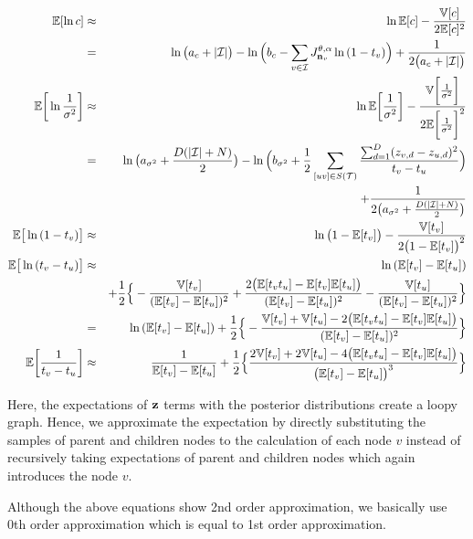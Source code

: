 \documentclass{article}
\begin{document}
	\begin{eqnarray}
		\mathbb{E}[\ln{c}] &\approx & \ln{\mathbb{E}[c]} - \frac{\mathbb{V}[c]}{2\mathbb{E}[c]^2} \nonumber \\
		&=& \ln{ \big( a_c + |\mathcal{I}| \big)} - \ln{ \Big( b_c - \sum_{v \in \mathcal{I}}J^{\theta, \alpha}_{\bold{n}_v}\ln{(1 - t_v})\Big)} + \frac{1}{2 \big( a_c + |\mathcal{I}| \big)} \\
		\mathbb{E} \bigg[ \ln{\frac{1}{\sigma^2}} \bigg] &\approx & \ln{\mathbb{E} \bigg[ \frac{1}{\sigma^2} \bigg]} - \frac{\mathbb{V}\bigg[ \frac{1}{\sigma^2} \bigg]}{2\mathbb{E}\bigg[ \frac{1}{\sigma^2} \bigg]^2} \nonumber \\
		&=& \ln{ \big( a_{\sigma^2} + \frac{D(|\mathcal{I}| + N)}{2} \big) } - \ln{ \Big( b_{\sigma^2} + \frac{1}{2}\sum_{[uv] \in S(\mathcal{T})}\frac{\sum^D_{d=1}(z_{v,d} - z_{u,d})^2}{t_v - t_u}\Big)} \nonumber \\
		& & + \frac{1}{2 \big( a_{\sigma^2} + \frac{D(|\mathcal{I}| + N)}{2} \big)}	 \nonumber \\
		\mathbb{E} \big[ \ln{(1 - t_v)} \big] &\approx & \ln{ \big( 1 - \mathbb{E}[t_v] \big)} - \frac{\mathbb{V}[t_v]}{2 \big( 1 - \mathbb{E}[t_v] \big)^2} \\
		\mathbb{E} \big[ \ln{(t_v - t_u)} \big] &\approx & \ln{(\mathbb{E}[t_v] - \mathbb{E}[t_u])} \nonumber \\
		& & + \frac{1}{2} \Big\{ -\frac{\mathbb{V}[t_v]}{(\mathbb{E}[t_v] - \mathbb{E}[t_u])^2} + \frac{2\big( \mathbb{E}[t_v t_u] - \mathbb{E}[t_v] \mathbb{E}[t_u] \big)}{(\mathbb{E}[t_v] - \mathbb{E}[t_u])^2} - \frac{\mathbb{V}[t_u]}{(\mathbb{E}[t_v] - \mathbb{E}[t_u])^2} \Big\} \nonumber \\
		&=& \ln{(\mathbb{E}[t_v] - \mathbb{E}[t_u])} + \frac{1}{2} \Big\{ -\frac{\mathbb{V}[t_v] + \mathbb{V}[t_u] - 2\big( \mathbb{E}[t_v t_u] - \mathbb{E}[t_v] \mathbb{E}[t_u] \big)}{(\mathbb{E}[t_v] - \mathbb{E}[t_u])^2} \Big\} \\
		\mathbb{E} \bigg[\frac{1}{t_v - t_u} \bigg] &\approx & \frac{1}{\mathbb{E}[t_v] - \mathbb{E}[t_u]} + \frac{1}{2} \Big\{ \frac{2\mathbb{V}[t_v] + 2\mathbb{V}[t_u] - 4\big( \mathbb{E}[t_v t_u] - \mathbb{E}[t_v] \mathbb{E}[t_u] \big)}{ \big( \mathbb{E}[t_v] - \mathbb{E}[t_u] \big)^3} \Big\}
	\end{eqnarray}

Here, the expectations of $\bold{z}$ terms with the posterior distributions create a loopy graph. Hence, we approximate the expectation by directly substituting the samples of parent and children nodes to the calculation of each node $v$ instead of recursively taking expectations of parent and children nodes which again introduces the node $v$.
	
	Although the above equations show 2nd order approximation, we basically use 0th order approximation which is equal to 1st order approximation.
	
\end{document}
